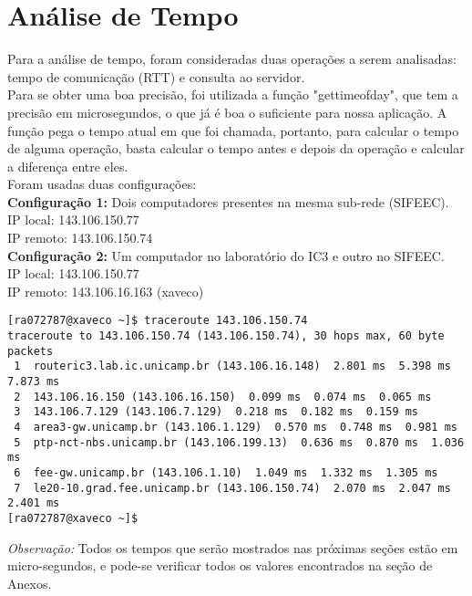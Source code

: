 \documentclass[11pt,twoside]{article}
\begin{document}
\section{Análise de Tempo}
Para a análise de tempo, foram consideradas duas operações a serem analisadas: tempo de comunicação (RTT) e consulta ao servidor.\\
Para se obter uma boa precisão, foi utilizada a função "gettimeofday", que tem a precisão em microsegundos, o que já é boa o suficiente para nossa aplicação. A função pega o tempo atual em que foi chamada, portanto, para calcular o tempo de alguma operação, basta calcular o tempo antes e depois da operação e calcular a diferença entre eles.\\
Foram usadas duas configurações:\\
\textbf{Configuração 1: }Dois computadores presentes na mesma sub-rede (SIFEEC).\\
IP local: 143.106.150.77\\
IP remoto: 143.106.150.74\\
\textbf{Configuração 2: }Um computador no laboratório do IC3 e outro no SIFEEC.\\
IP local: 143.106.150.77\\
IP remoto: 143.106.16.163 (xaveco)\\
\begin{verbatim}
[ra072787@xaveco ~]$ traceroute 143.106.150.74
traceroute to 143.106.150.74 (143.106.150.74), 30 hops max, 60 byte packets
 1  routeric3.lab.ic.unicamp.br (143.106.16.148)  2.801 ms  5.398 ms  7.873 ms
 2  143.106.16.150 (143.106.16.150)  0.099 ms  0.074 ms  0.065 ms
 3  143.106.7.129 (143.106.7.129)  0.218 ms  0.182 ms  0.159 ms
 4  area3-gw.unicamp.br (143.106.1.129)  0.570 ms  0.748 ms  0.981 ms
 5  ptp-nct-nbs.unicamp.br (143.106.199.13)  0.636 ms  0.870 ms  1.036 ms
 6  fee-gw.unicamp.br (143.106.1.10)  1.049 ms  1.332 ms  1.305 ms
 7  le20-10.grad.fee.unicamp.br (143.106.150.74)  2.070 ms  2.047 ms  2.401 ms
[ra072787@xaveco ~]$
\end{verbatim}
\textit{Observação: }Todos os tempos que serão mostrados nas próximas seções estão em micro-segundos, e pode-se verificar todos os valores encontrados na seção de Anexos.\\
\end{document}
